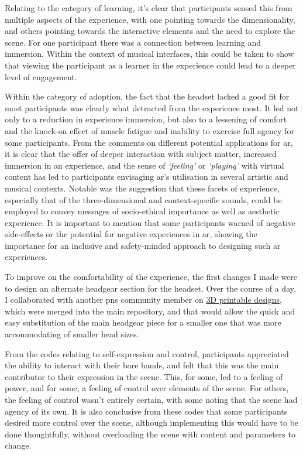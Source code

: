 Relating to the category of learning, it's clear that participants sensed this from multiple aspects of the experience, with one pointing towards the dimensionality, and others pointing towards the interactive elements and the need to explore the scene. For one participant there was a connection between learning and immersion. Within the context of musical interfaces, this could be taken to show that viewing the participant as a learner in the experience could lead to a deeper level of engagement.

Within the category of adoption, the fact that the headset lacked a good fit for most participants was clearly what detracted from the experience most. It led not only to a reduction in experience immersion, but also to a lessening of comfort and the knock-on effect of muscle fatigue and inability to exercise full agency for some participants. From the comments on different potential applications for \gls{ar}, it is clear that the offer of deeper interaction with subject matter, increased immersion in an experience, and the sense of \textit{`feeling'} or \textit{`playing'} with virtual content has led to participants envisaging \gls{ar}'s utilisation in several artistic and musical contexts. Notable was the suggestion that these facets of experience, especially that of the three-dimensional and context-specific sounds, could be employed to convey messages of socio-ethical importance as well as aesthetic experience. It is important to mention that some participants warned of negative side-effects or the potential for negative experiences in \gls{ar}, showing the importance for an inclusive and safety-minded approach to designing such \gls{ar} experiences.

To improve on the comfortability of the experience, the first changes I made were to design an alternate headgear section for the headset. Over the course of a day, I collaborated with another \gls{pns} community member on \href{https://github.com/AheadIO/Deck-X/tree/main/Deck_X/STL_files/Headgear/Welding_Headgear_Adaptor}{3D printable designs}, which were merged into the main repository, and that would allow the quick and easy substitution of the main headgear piece for a smaller one that was more accommodating of smaller head sizes.

From the codes relating to self-expression and control, participants appreciated the ability to interact with their bare hands, and felt that this was the main contributor to their expression in the scene. This, for some, led to a feeling of power, and for some, a feeling of control over elements of the scene. For others, the feeling of control wasn't entirely certain, with some noting that the scene had agency of its own. It is also conclusive from these codes that some participants desired more control over the scene, although implementing this would have to be done thoughtfully, without overloading the scene with content and parameters to change.

